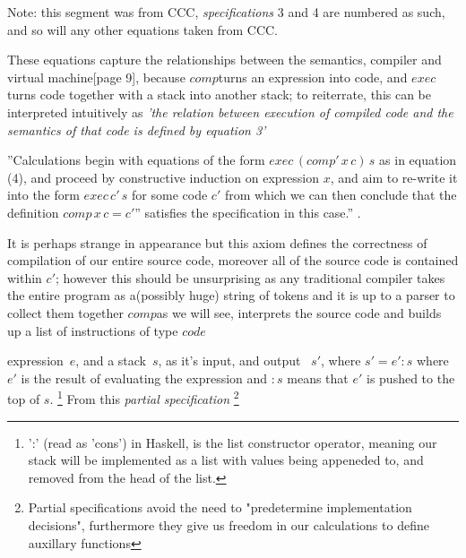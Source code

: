 \documentclass {article}
\begin{document}
\newcommand{\exec}{$exec$}
\newcommand{\comp}{$comp$}
\newcommand{\compp}{$comp'$}

Note: this segment was from CCC,
\emph{specifications} 3 and 4 are numbered as such,
and so will any other equations taken from CCC.
 
These equations capture the relationships between
the semantics, compiler and virtual machine\cite{bandh}[page 9],
because \comp turns an expression into code,
and \exec turns code together with a stack into another stack;
to reiterrate, this can be interpreted intuitively as
\emph{'the relation between execution of
compiled code and the semantics of that code
is defined by equation 3'}


''Calculations begin with equations
of the form $exec \, (comp' \, x \, c) \, s$
as in equation (4),
and proceed by constructive induction on 
expression $x$, 
and aim to re-write it into the form
$exec \, c' \, s$ for some code $c'$
from which we can then conclude that the definition
$comp \, x \, c = c'$'' satisfies the 
specification in this case.''
\cite{bandh}.

It is perhaps strange in appearance
but this axiom %
defines the correctness of compilation of our entire source code,
moreover all of the source code is contained within $c'$;
however this should be unsurprising as any traditional compiler
takes the entire program as a(possibly huge) string of tokens
and it is up to a parser to collect them together
\comp as we will see, interprets the source code and builds up a
list of instructions of type $code$





expression~$e$, and a stack~$s$, as it's input, and output ~$s'$, where \(s' = e':s \) where $e'$ is the result of evaluating the expression and $:s$ means that $e'$ is pushed to the top of $s$.
\footnote{':' (read as 'cons') in Haskell, is the list constructor operator, meaning our stack will be implemented as a list with values being appeneded to, and removed from the head of the list.}
From this \emph{partial specification}
\footnote{Partial specifications avoid the need to "predetermine implementation decisions", furthermore they give us freedom in our calculations to define auxillary functions} 
\end{document}
